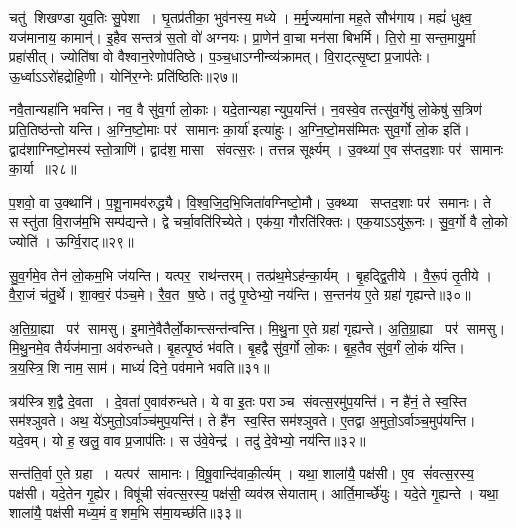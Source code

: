 चतु॑ शिखण्डा युव॒तिः सु॒पेशा।
घृ॒तप्र॑तीका॒ भुव॑नस्य॒ मध्ये।
म॒र्मृ॒ज्यमा॑ना मह॒ते सौभ॑गाय।
मह्यं॑ धुक्ष्व॒ यज॑मानाय॒ कामान्॑।
इ॒हैव सन्तत्र॑ स॒तो वो॑ अग्नयः।
प्रा॒णेन॑ वा॒चा मन॑सा बिभर्मि।
ति॒रो मा॒ सन्त॒मायु॒र्मा प्रहा॑सीत्।
ज्योति॑षा वो वैश्वान॒रेणोप॑तिष्ठे।
प॒ञ्च॒धाऽग्नीन्व्य॑क्रामत्।
वि॒राट्त्सृ॒ष्टा प्र॒जाप॑तेः।
ऊ॒र्ध्वाऽऽरो॑हद्रोहि॒णी।
योनि॑र॒ग्नेः प्रति॑ष्ठितिः॥२७॥\anuvakamend[वि॒श॒न्तु॒ न॒ पु॒रू॒चीर्वि॑धेम नि॒धाय॒ यत्तेऽप्र॑दाहाय बृह॒त्यो ब्रह्म॑णा दुवस्यत वि॒श्ववा॑र इ॒ममृ॑ञ्जते पुरो॒गां प्रज॑नयि॒ष्यथो॑ जनि॒ष्यतेऽस्मै॒ मम॑ महि॒म्ना वर्च॑से॒ दध॑त्सुव॒र्गो भा॑हि सम्बभू॒वतु॒रायु॒र्व्या॑नशे॒ चतु॑ष्पदः स॒तां प्र॒जाप॑ते॒र्द्वे च॑]

नवै॒तान्यहा॑नि भवन्ति।
नव॒ वै सु॑व॒र्गा लो॒काः।
यदे॒तान्यहान्युप॒यन्ति॑।
न॒वस्वे॒व तत्सु॑व॒र्गेषु॑ लो॒केषु॑ स॒त्रिण॑ प्रति॒तिष्ठ॑न्तो यन्ति।
अ॒ग्नि॒ष्टो॒माः पर॑ सामानः का॒र्या॑ इत्या॑हुः।
अ॒ग्नि॒ष्टो॒मस॑म्मितः सुव॒र्गो लो॒क इति॑।
द्वाद॑शाग्निष्टो॒मस्य॑ स्तो॒त्राणि॑।
द्वाद॑श॒ मासा संवत्स॒रः।
तत्तन्न सूर्क्ष्यम्।
उ॒क्थ्या॑ ए॒व स॑प्तद॒शाः पर॑ सामानः का॒र्या॥२८॥

प॒शवो॒ वा उ॒क्थानि॑।
प॒शू॒नामव॑रुद्ध्यै।
वि॒श्व॒जि॒द॒भि॒जिता॑\-वग्निष्टो॒मौ।
उ॒क्थ्या सप्तद॒शाः पर॑ समानः।
ते सस्तु॑ता वि॒राज॑म॒भि सम्प॑द्यन्ते।
द्वे चर्चा॒वति॑रिच्येते।
एक॑या॒ गौरति॑रिक्तः।
एक॒याऽऽयु॑रू॒नः।
सु॒व॒र्गो वै लो॒को ज्योति॑।
ऊर्ग्वि॒राट्॥२९॥

सु॒व॒र्गमे॒व तेन॑ लो॒कम॒भि ज॑यन्ति।
यत्पर॒ राथ॑न्तरम्।
तत्प्र॑थ॒मेऽह॑न्का॒र्यम्।
बृ॒हद्द्वि॒तीये।
वै॒रू॒पं तृ॒तीये।
वै॒रा॒जं च॑तु॒र्थे।
शा॒क्व॒रं प॑ञ्च॒मे।
रै॒व॒त ष॒ष्ठे।
तदु॑ पृ॒ष्ठेभ्यो॒ नय॑न्ति।
स॒न्तन॑य ए॒ते ग्रहा॑ गृह्यन्ते॥३०॥

अ॒ति॒ग्रा॒ह्या पर॑ सामसु।
इ॒माने॒वैतैर्लो॒कान्त्सन्त॑न्वन्ति।
मि॒थु॒ना ए॒ते ग्रहा॑ गृह्यन्ते।
अ॒ति॒ग्रा॒ह्या पर॑ सामसु।
मि॒थु॒नमे॒व तैर्यज॑माना॒ अव॑रुन्धते।
बृ॒हत्पृ॒ष्ठं भ॑वति।
बृ॒हद्वै सु॑व॒र्गो लो॒कः।
बृ॒ह॒तैव सु॑व॒र्गं लो॒कं य॑न्ति।
त्र॒य॒स्त्रि॒शि  नाम॒ साम॑।
माध्यं॑ दिने॒ पव॑माने भवति॥३१॥

त्रय॑स्त्रिश॒द्वै दे॒वता।
दे॒वता॑ ए॒वाव॑रुन्धते।
ये वा इ॒तः पराञ्च संवत्स॒रमु॑प॒यन्ति॑।
न है॑नं॒ ते स्व॒स्ति सम॑श्ञुवते।
अथ॒ ये॑ऽमुतो॒ऽर्वाञ्च॑मुप॒यन्ति॑।
ते है॑न स्व॒स्ति सम॑श्ञुवते।
ए॒तद्वा अ॒मुतो॒ऽर्वाञ्च॒मुप॑यन्ति।
यदे॒वम्।
यो ह॒ खलु॒ वाव प्र॒जाप॑तिः।
स उ॑वे॒वेन्द्र॑।
तदु॑ दे॒वेभ्यो॒ नय॑न्ति॥३२॥\anuvakamend[का॒र्या॑ वि॒राड्गृ॑ह्यन्ते॒ पव॑माने भव॒तीन्द्र॒ एकं॑ च]

सन्त॑ति॒र्वा ए॒ते ग्रहा।
यत्पर॑ सामानः।
वि॒षू॒वान्दि॑वाकी॒र्त्यम्।
यथा॒ शाला॑यै॒ पक्ष॑सी।
ए॒व सं॑वत्स॒रस्य॒ पक्ष॑सी।
यदे॒तेन गृ॒ह्येर\sn{}।
विषू॑ची संवत्स॒रस्य॒ पक्ष॑सी॒ व्यव॑स्रसेयाताम्।
आर्ति॒मार्च्छे॑युः।
यदे॒ते गृ॒ह्यन्ते।
यथा॒ शाला॑यै॒ पक्ष॑सी मध्य॒मं व॒शम॒भि स॑मा॒यच्छ॑ति॥३३॥

